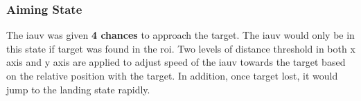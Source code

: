 \subsubsection{Aiming State}

The \gls{iauv} was given \textbf{4 chances} to approach the target. The
\gls{iauv} would only be in this state if target was found in the \gls{roi}. Two
levels of distance threshold in both x axis and y axis are applied to adjust
speed of the \gls{iauv} towards the target based on the relative position with
the target. In addition, once target lost, it would jump to the landing state
rapidly.